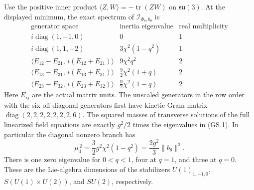 \begin{theorem}
\label{q444:gauge-spectrum}
Use the positive inner product
$\langle Z,W\rangle=-\operatorname{tr}(ZW)$ on $\mathfrak{su}(3)$.
At the displayed minimum, the exact spectrum of
$\mathscr I_{\Phi_\theta,b_\theta}$ is
\[
\begin{array}{c|c|c}
\text{generator space}&\text{inertia eigenvalue}&
                         \text{real multiplicity}\\ \hline
i\operatorname{diag}(1,-1,0)&0&1\\
i\operatorname{diag}(1,1,-2)&3\chi^2(1-q^2)&1\\
\langle E_{12}-E_{21},\,i(E_{12}+E_{21})\rangle
                         &9\chi^2q^2&2\\
\langle E_{13}-E_{31},\,i(E_{13}+E_{31})\rangle
                         &\frac92\chi^2(1+q)&2\\
\langle E_{23}-E_{32},\,i(E_{23}+E_{32})\rangle
                         &\frac92\chi^2(1-q)&2
\end{array}                                                    \tag{GS.1}
\]
Here $E_{ij}$ are the actual matrix units. The unscaled generators in
the row order with the six off-diagonal generators first have kinetic
Gram matrix $\operatorname{diag}(2,2,2,2,2,2,2,6)$.
The squared masses of transverse solutions of the full linearized
field equations are exactly $g^2/2$ times the eigenvalues in (GS.1).
In particular the diagonal nonzero branch has
\[
 \mu_{\mathrm d}^{\,2}
   =\frac32 g^2\chi^2(1-q^2)=\frac{2g^2}{3}\|b_\theta\|^2.
                                                               \tag{GS.2}
\]
There is one zero eigenvalue for $0<q<1$, four at $q=1$, and three
at $q=0$. These are the Lie-algebra dimensions of the stabilizers
$U(1)_{1,-1,0}$, $S(U(1)\times U(2))$, and $SU(2)$, respectively.
\end{theorem}
